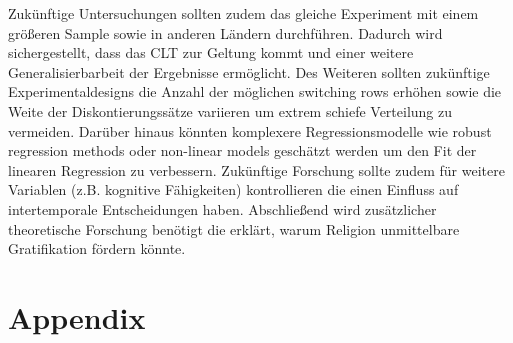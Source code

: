 \documentclass[11pt,a4paper]{article}
\begin{document}
Zukünftige Untersuchungen sollten zudem das gleiche Experiment mit einem größeren Sample sowie in anderen Ländern durchführen. Dadurch wird sichergestellt, dass das CLT zur Geltung kommt und einer weitere Generalisierbarbeit der Ergebnisse ermöglicht. Des Weiteren sollten zukünftige Experimentaldesigns die Anzahl der möglichen switching rows erhöhen sowie die Weite der Diskontierungssätze variieren um extrem schiefe Verteilung zu vermeiden. Darüber hinaus könnten komplexere Regressionsmodelle wie robust regression methods oder non-linear models geschätzt werden um den Fit der linearen Regression zu verbessern. Zukünftige Forschung sollte zudem für weitere Variablen (z.B. kognitive Fähigkeiten) kontrollieren die einen Einfluss auf intertemporale Entscheidungen haben. Abschließend wird zusätzlicher theoretische Forschung benötigt die erklärt, warum Religion unmittelbare Gratifikation fördern könnte. 

\newpage

\section{Appendix}




\newpage
\printbibliography

\newpage

\end{document}
